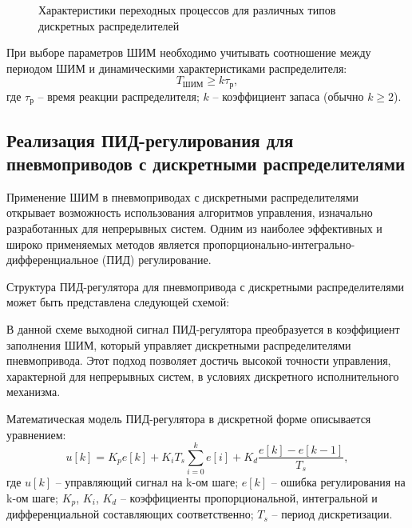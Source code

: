 \begin{figure}[ht]
    \caption{Характеристики переходных процессов для различных типов дискретных распределителей}
    \label{fig:ch3:pwm_valve_response}
\end{figure}

При выборе параметров ШИМ необходимо учитывать соотношение между
периодом ШИМ и динамическими характеристиками распределителя:
\begin{equation*}
T_{ШИМ} \geq k\tau_{\text{р}},
\end{equation*}
где $\tau_{\text{р}}$ -- время реакции распределителя;
$k$ -- коэффициент запаса (обычно $k \geq 2$).

\subsection{Реализация ПИД-регулирования для пневмоприводов с дискретными распределителями}\label{subsec:ch3/sec1/sub2}
Применение ШИМ в пневмоприводах с дискретными распределителями открывает
возможность использования алгоритмов управления,
изначально разработанных для непрерывных систем.
Одним из наиболее эффективных и широко применяемых методов является
пропорционально-интегрально-дифференциальное (ПИД) регулирование.

Структура ПИД-регулятора для пневмопривода
с дискретными распределителями может быть представлена следующей схемой:
\begin{figure}[ht]
    \label{fig:ch3:pid_pwm_control}
\end{figure}
В данной схеме выходной сигнал ПИД-регулятора преобразуется в коэффициент
заполнения ШИМ, который управляет дискретными распределителями
пневмопривода. Этот подход позволяет достичь высокой точности
управления, характерной для непрерывных систем, в условиях
дискретного исполнительного механизма.

Математическая модель ПИД-регулятора в дискретной форме описывается уравнением:
\begin{equation*}
u[k] = K_p e[k] + K_i T_s \sum_{i=0}^k e[i] + K_d \frac{e[k] - e[k-1]}{T_s},
\end{equation*}
где
$u[k]$ -- управляющий сигнал на k-ом шаге;
$e[k]$ -- ошибка регулирования на k-ом шаге;
$K_p$, $K_i$, $K_d$ -- коэффициенты пропорциональной, интегральной и
дифференциальной составляющих соответственно;
$T_s$ -- период дискретизации.

